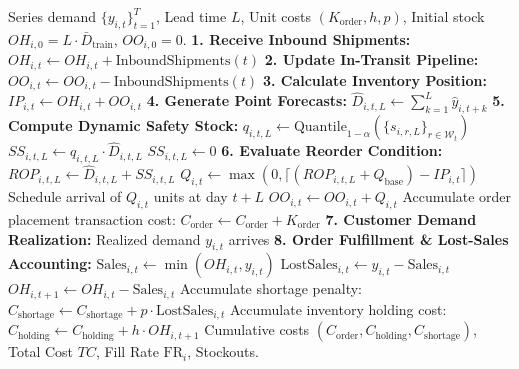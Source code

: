 \begin{algorithm}[htbp]
\small
\caption{Daily Discrete-Event Replenishment Simulation with Lost-Sales Accounting}
\label{alg:inventory_simulation}
\begin{algorithmic}[1]
\REQUIRE Series demand $\{y_{i,t}\}_{t=1}^T$, Lead time $L$, Unit costs $(K_{\text{order}}, h, p)$, Initial stock $OH_{i,0} = L \cdot \bar{D}_{\text{train}}$, $OO_{i,0} = 0$.
    \STATE \textbf{1. Receive Inbound Shipments:} $OH_{i,t} \leftarrow OH_{i,t} + \text{InboundShipments}(t)$
    \STATE \textbf{2. Update In-Transit Pipeline:} $OO_{i,t} \leftarrow OO_{i,t} - \text{InboundShipments}(t)$
    \STATE \textbf{3. Calculate Inventory Position:} $IP_{i,t} \leftarrow OH_{i,t} + OO_{i,t}$
    \STATE \textbf{4. Generate Point Forecasts:} $\hat{D}_{i,t,L} \leftarrow \sum_{k=1}^L \hat{y}_{i,t+k}$
    \STATE \textbf{5. Compute Dynamic Safety Stock:} 
        \STATE $q_{i,t,L} \leftarrow \text{Quantile}_{1-\alpha}\left( \{s_{i,r,L}\}_{r \in \mathcal{W}_t} \right)$
        \STATE $SS_{i,t,L} \leftarrow q_{i,t,L} \cdot \hat{D}_{i,t,L}$
    \ELSE
        \STATE $SS_{i,t,L} \leftarrow 0$
    \ENDIF
    \STATE \textbf{6. Evaluate Reorder Condition:} $ROP_{i,t,L} \leftarrow \hat{D}_{i,t,L} + SS_{i,t,L}$
        \STATE $Q_{i,t} \leftarrow \max\left(0, \lceil (ROP_{i,t,L} + Q_{\text{base}}) - IP_{i,t} \rceil\right)$
        \STATE Schedule arrival of $Q_{i,t}$ units at day $t+L$
        \STATE $OO_{i,t} \leftarrow OO_{i,t} + Q_{i,t}$
        \STATE Accumulate order placement transaction cost: $C_{\text{order}} \leftarrow C_{\text{order}} + K_{\text{order}}$
    \ENDIF
    \STATE \textbf{7. Customer Demand Realization:} Realized demand $y_{i,t}$ arrives
    \STATE \textbf{8. Order Fulfillment \& Lost-Sales Accounting:}
    \STATE $\text{Sales}_{i,t} \leftarrow \min(OH_{i,t}, y_{i,t})$
    \STATE $\text{LostSales}_{i,t} \leftarrow y_{i,t} - \text{Sales}_{i,t}$
    \STATE $OH_{i,t+1} \leftarrow OH_{i,t} - \text{Sales}_{i,t}$
    \STATE Accumulate shortage penalty: $C_{\text{shortage}} \leftarrow C_{\text{shortage}} + p \cdot \text{LostSales}_{i,t}$
    \STATE Accumulate inventory holding cost: $C_{\text{holding}} \leftarrow C_{\text{holding}} + h \cdot OH_{i,t+1}$
\ENDFOR
\ENSURE Cumulative costs $(C_{\text{order}}, C_{\text{holding}}, C_{\text{shortage}})$, Total Cost $TC$, Fill Rate $\text{FR}_i$, Stockouts.
\end{algorithmic}
\end{algorithm}


